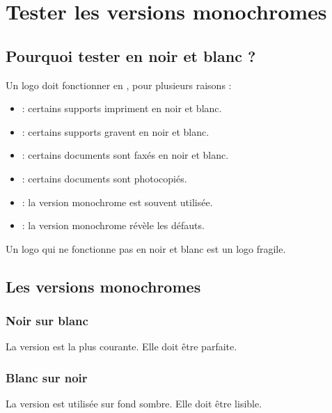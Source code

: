 \section{Tester les versions monochromes}

\subsection{Pourquoi tester en noir et blanc ?}

Un logo doit fonctionner en , pour plusieurs raisons :

\begin{itemize}
    \item {} : certains supports impriment en noir et blanc.
    \item {} : certains supports gravent en noir et blanc.
    \item {} : certains documents sont faxés en noir et blanc.
    \item {} : certains documents sont photocopiés.
    \item {} : la version monochrome est souvent utilisée.
    \item {} : la version monochrome révèle les défauts.
\end{itemize}

Un logo qui ne fonctionne pas en noir et blanc est un logo fragile.

\subsection{Les versions monochromes}

\subsubsection{Noir sur blanc}

La version  est la plus courante. Elle doit être parfaite.

\subsubsection{Blanc sur noir}

La version  est utilisée sur fond sombre. Elle doit être lisible.

